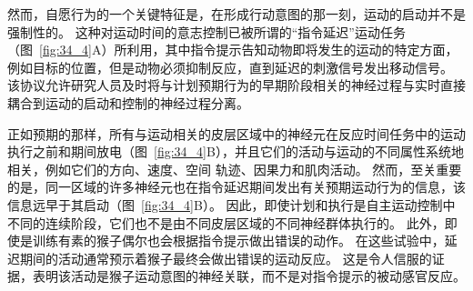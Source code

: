 然而，自愿行为的一个关键特征是，在形成行动意图的那一刻，运动的启动并不是强制性的。
这种对运动时间的意志控制已被所谓的“指令延迟”运动任务（图~\ref{fig:34_4}A）所利用，其中指令提示告知动物即将发生的运动的特定方面，例如目标的位置，但是动物必须抑制反应，直到延迟的刺激信号发出移动信号。
该协议允许研究人员及时将与计划预期行为的早期阶段相关的神经过程与实时直接耦合到运动的启动和控制的神经过程分离。


正如预期的那样，所有与运动相关的皮层区域中的神经元在反应时间任务中的运动执行之前和期间放电（图~\ref{fig:34_4}B），并且它们的活动与运动的不同属性系统地相关，例如它们的方向、速度、空间 轨迹、因果力和肌肉活动。
然而，至关重要的是，同一区域的许多神经元也在指令延迟期间发出有关预期运动行为的信息，该信息远早于其启动（图~\ref{fig:34_4}B）。
因此，即使计划和执行是自主运动控制中不同的连续阶段，它们也不是由不同皮层区域的不同神经群体执行的。
此外，即使是训练有素的猴子偶尔也会根据指令提示做出错误的动作。
在这些试验中，延迟期间的活动通常预示着猴子最终会做出错误的运动反应。
这是令人信服的证据，表明该活动是猴子运动意图的神经关联，而不是对指令提示的被动感官反应。


